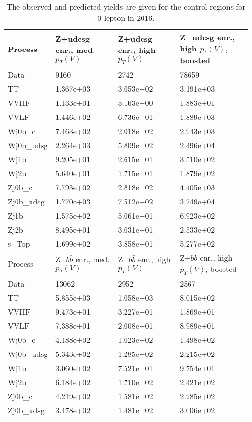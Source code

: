 \begin{table}
\centering
\caption[2016 0-lepton control region yields]{
                  The observed and predicted yields are given for the
                  control regions for 0-lepton in 2016.
                  }
{\footnotesize
\begin{tabularx}{0.8\textwidth}{|X|X|X|X|}
\hline
Process & Z+udcsg enr., med. $p_{T}(V)$ & Z+udcsg enr., high $p_{T}(V)$ & Z+udcsg enr., high $p_{T}(V)$, boosted \\
\hline
Data & 9160 & 2742 & 78659 \\
\hline
TT & 1.367e+03 & 3.053e+02 & 3.191e+03 \\
VVHF & 1.133e+01 & 5.163e+00 & 1.883e+01 \\
VVLF & 1.446e+02 & 6.736e+01 & 1.889e+03 \\
Wj0b\_c & 7.463e+02 & 2.018e+02 & 2.943e+03 \\
Wj0b\_udsg & 2.264e+03 & 5.809e+02 & 2.496e+04 \\
Wj1b & 9.205e+01 & 2.615e+01 & 3.510e+02 \\
Wj2b & 5.640e+01 & 1.715e+01 & 1.879e+02 \\
Zj0b\_c & 7.793e+02 & 2.818e+02 & 4.405e+03 \\
Zj0b\_udsg & 1.770e+03 & 7.512e+02 & 3.749e+04 \\
Zj1b & 1.575e+02 & 5.061e+01 & 6.923e+02 \\
Zj2b & 8.495e+01 & 3.031e+01 & 2.533e+02 \\
s\_Top & 1.699e+02 & 3.858e+01 & 5.277e+02 \\
\hline
\hline
Process & Z+$b\bar{b}$ enr., med. $p_{T}(V)$ & Z+$b\bar{b}$ enr., high $p_{T}(V)$ & Z+$b\bar{b}$ enr., high $p_{T}(V)$, boosted \\
\hline
Data & 13062 & 2952 & 2567 \\
\hline
TT & 5.855e+03 & 1.058e+03 & 8.015e+02 \\
VVHF & 9.473e+01 & 3.227e+01 & 1.869e+01 \\
VVLF & 7.388e+01 & 2.008e+01 & 8.989e+01 \\
Wj0b\_c & 4.188e+02 & 1.023e+02 & 1.498e+02 \\
Wj0b\_udsg & 5.343e+02 & 1.285e+02 & 2.215e+02 \\
Wj1b & 3.060e+02 & 7.521e+01 & 9.754e+01 \\
Wj2b & 6.184e+02 & 1.710e+02 & 2.421e+02 \\
Zj0b\_c & 4.219e+02 & 1.581e+02 & 2.285e+02 \\
Zj0b\_udsg & 3.478e+02 & 1.481e+02 & 3.006e+02 \\

\end{tabularx}}
\end{table}
